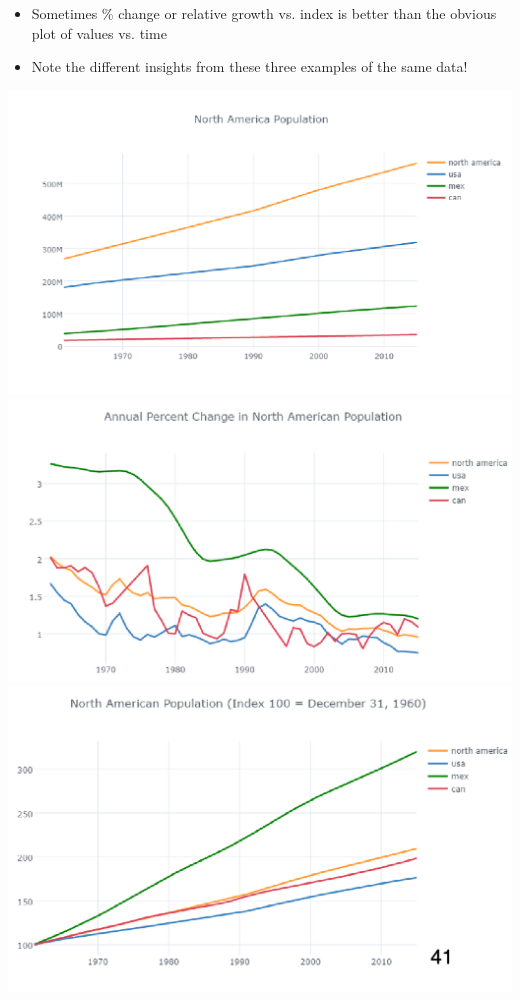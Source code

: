\documentclass[11pt]{article}
\theoremstyle{definition}
\begin{document}
\begin{itemize}
  \item Sometimes \% change or
  relative growth vs. index
  is better than the obvious
  plot of values vs. time
  \item Note the different insights
  from these three examples
  of the same data!
\end{itemize}
\includegraphics[width=\textwidth/2]{30.png}
\includegraphics[width=\textwidth/2]{31.png}
\includegraphics[width=\textwidth/2]{32.png}
\end{document}
